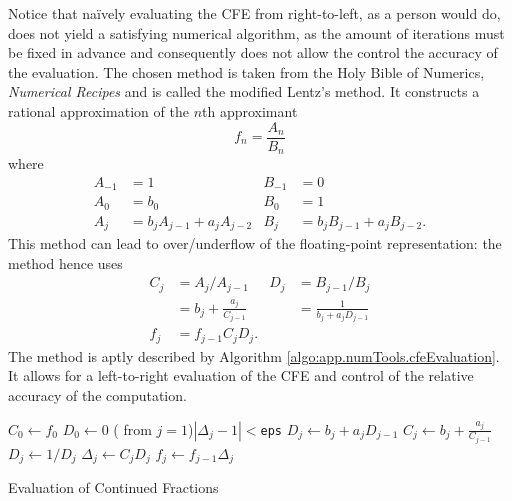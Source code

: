 Notice that naïvely evaluating the CFE from right-to-left, as a person would do, 
does not yield a satisfying numerical algorithm, as the amount of iterations 
must be fixed in advance and consequently does not allow the control the 
accuracy of the evaluation. The chosen method is taken from the Holy Bible
of Numerics, \textit{Numerical Recipes} \cite{PRE2007} and is called 
the modified Lentz's method. It constructs a rational approximation
of the $n$th approximant 
  \begin{equation}
    f_n = \frac{A_n}{B_n}
  \end{equation}
where 
  \begin{align}
   A_{-1} 	&=1 			& B_{-1} 	&=0	\nonumber\\
   A_0		&= b_0			& B_0		&=1	\\
   A_j		&=b_jA_{j-1}+a_jA_{j-2}	& B_j 		&=b_jB_{j-1}+a_jB_{j-2}.\nonumber
  \end{align}
This method can lead to over/underflow of the floating-point representation: 
the method hence uses 
  \begin{align}
    C_j &= A_j/A_{j-1}			&	D_j	&= B_{j-1}/B_j	\nonumber\\
    	&= b_j+\frac{a_j}{C_{j-1}}	&		&= \frac{1}{b_j+a_jD_{j-1}}\\
    f_j	&= f_{j-1}C_jD_j.\nonumber
  \end{align}
The method is aptly described by Algorithm \ref{algo:app.numTools.cfeEvaluation}.
It allows for a left-to-right evaluation of the CFE and control of the relative
accuracy of the computation. 

  \begin{algorithm}
   $C_0 \leftarrow f_0$\;
   $D_0 \leftarrow 0$\;
   \Repeat( from $j=1$){$|\Delta_j-1|<$\texttt{eps}}%
   {
    $D_j \leftarrow b_j+a_jD_{j-1}$\;
    $C_j \leftarrow b_j+\frac{a_j}{C_{j-1}}$\;
    $D_j \leftarrow 1/D_j$\;
    $\Delta_j\leftarrow C_jD_j$\;
    $f_j \leftarrow f_{j-1}\Delta_j$
   }
  \caption{Evaluation of Continued Fractions}
  \label{algo:app.numTools.cfeEvaluation}
  \end{algorithm}

